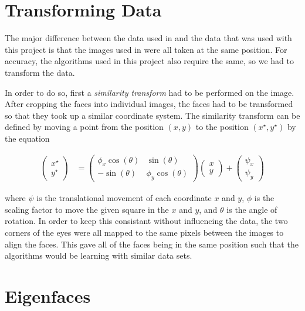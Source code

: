 \documentclass{article}
\begin{document}
\section*{Transforming Data}

The major difference between the data used in \cite{MormonID} and the data that was used with this project is that the images used in \cite{MormonID} were all taken at the same position. For accuracy, the algorithms used in this project also require the same, so we had to transform the data. 

In order to do so, first a {\em similarity transform} had to be performed on the image. After cropping the faces into individual images, the faces had to be transformed so that they took up a similar coordinate system. The similarity transform can be defined by moving a point from the position $(x,y)$ to the position $(x^{\star}, y^{\star})$ by the equation

\begin{align*}
  \begin{pmatrix}
    x^{\star} \\
    y^{\star}
\end{pmatrix} &= \begin{pmatrix}
\phi_{x}\cos(\theta) & \sin(\theta)\\
-\sin(\theta) & \phi_{y}\cos(\theta)
\end{pmatrix}  \begin{pmatrix}
    x \\
    y
\end{pmatrix} +   \begin{pmatrix}
    \psi_{x} \\
    \psi_{y}
\end{pmatrix}
\end{align*}

where $\psi$ is the translational movement of each coordinate $x$ and $y$, $\phi$ is the scaling factor to move the given square in the $x$ and $y$, and $\theta$ is the angle of rotation. In order to keep this consistant without influencing the data, the two corners of the eyes were all mapped to the same pixels between the images to align the faces. This gave all of the faces being in the same position such that the algorithms would be learning with similar data sets.

\section*{Eigenfaces}
\end{document}
